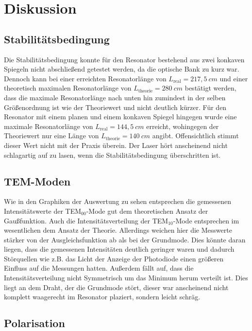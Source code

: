 \section{Diskussion}
\label{sec:Diskussion}

\subsection{Stabilitätsbedingung}

Die Stabilitätsbedingung konnte für den Resonator bestehend aus zwei konkaven Spiegeln nicht abschließend getestet werden, 
da die optische Bank zu kurz war. Dennoch kann bei einer erreichten Resonatorlänge von $L_{\text{real}} = 217,5 \: cm$ und einer 
theoretisch maximalen Resonatorlänge von $L_{\text{theorie}} = 280 \: cm$ bestätigt werden, dass die maximale Resonatorlänge 
nach unten hin zumindest in der selben Größenordnung ist wie der Theoriewert und nicht deutlich kürzer.
Für den Resonator mit einem planen und einem konkaven Spiegel hingegen wurde eine maximale Resonatorlänge von $L_{\text{real}} = 144,5 \: cm$
erreicht, wohingegen der Theoriewert nur eine Länge von $L_{\text{theorie}} = 140 \: cm$ angibt.
Offensichtlich stimmt dieser Wert nicht mit der Praxis überein. Der Laser hört anscheinend nicht schlagartig auf zu lasen, 
wenn die Stabilitätsbedingung überschritten ist.


\subsection{TEM-Moden}

Wie in den Graphiken der Auswertung zu sehen entsprechen die gemessenen Intensitätswerte der TEM$_{00}$-Mode gut dem theoretischen 
Ansatz der Gaußfunktion. 
Auch die Intensitätsverteilung der TEM$_{10}$-Mode entsprechen im wesentlichen dem Ansatz der Theorie.
Allerdings weichen hier die Messwerte stärker von der Ausgleichsfunktion ab als bei der Grundmode. 
Dies könnte daran liegen, dass die gemessenen Intensitäten deutlich geringer waren und dadurch Störquellen wie z.B. das Licht 
der Anzeige der Photodiode einen größeren Einfluss auf die Messungen hatten.
Außerdem fällt auf, dass die Intensitätsverteilung nicht Symmetrisch um das Minimum herum verteilt ist. 
Dies liegt an dem Draht, der die Grundmode stört, dieser war anscheinend nicht komplett waagerecht im Resonator plaziert, sondern leicht schräg.


\subsection{Polarisation}

